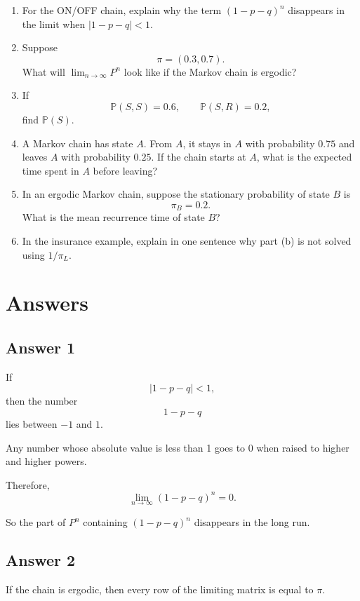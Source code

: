 \documentclass[12pt,a4paper]{article}
\theoremstyle{notestyle}
\newcommand{\Prob}{\mathbb{P}}
\begin{document}
\begin{enumerate}[label=\textbf{Q\arabic*.}, leftmargin=1.2cm]
    \item For the ON/OFF chain, explain why the term $(1-p-q)^n$ disappears in the limit when $|1-p-q|<1$.

    \item Suppose
    \[
    \pi=(0.3,0.7).
    \]
    What will $\lim_{n\to\infty}P^n$ look like if the Markov chain is ergodic?

    \item If
    \[
    \Prob(S,S)=0.6,\qquad \Prob(S,R)=0.2,
    \]
    find $\Prob(S)$.

    \item A Markov chain has state $A$. From $A$, it stays in $A$ with probability $0.75$ and leaves $A$ with probability $0.25$. If the chain starts at $A$, what is the expected time spent in $A$ before leaving?

    \item In an ergodic Markov chain, suppose the stationary probability of state $B$ is
    \[
    \pi_B=0.2.
    \]
    What is the mean recurrence time of state $B$?

    \item In the insurance example, explain in one sentence why part (b) is not solved using $1/\pi_L$.
\end{enumerate}

\section{Answers}

\subsection*{Answer 1}

If
\[
|1-p-q|<1,
\]
then the number
\[
1-p-q
\]
lies between $-1$ and $1$.

Any number whose absolute value is less than 1 goes to 0 when raised to higher and higher powers.

Therefore,
\[
\lim_{n\to\infty}(1-p-q)^n=0.
\]

So the part of $P^n$ containing $(1-p-q)^n$ disappears in the long run.

\subsection*{Answer 2}

If the chain is ergodic, then every row of the limiting matrix is equal to $\pi$.
\end{document}
